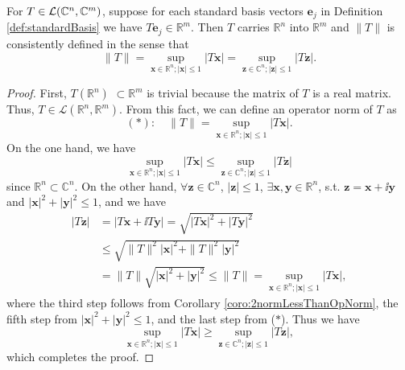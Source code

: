 \begin{lem}
  \label{lem:consistencyNestedRealInsideComplex}
  For $T\in{\cal L}(\mathbb{C}^n,\mathbb{C}^m)$, 
  suppose for each standard basis vectors $\mathbf{e}_j$
  in Definition \ref{def:standardBasis}
  we have $T \mathbf{e}_j \in \mathbb{R}^m$.
  Then $T$ carries $\mathbb{R}^n$ into $\mathbb{R}^m$
  and $\|T\|$ is consistently defined in the sense that
  \begin{equation}
    \label{eq:consistencyNestedRealInsideComplex}
    \|T\|
    = \sup_{\mathbf{x}\in \mathbb{R}^n; |\mathbf{x}|\le 1} |T \mathbf{x}|
    = \sup_{\mathbf{z}\in \mathbb{C}^n; |\mathbf{z}|\le 1} |T \mathbf{z}|.
  \end{equation}
\end{lem}
\begin{proof}
  First, $T(\mathbb{R}^n)$ $\subset \mathbb{R}^m$ is trivial
  because the matrix of $T$ is a real matrix.
  Thus, $T \in \mathcal{L}(\mathbb{R}^n, \mathbb{R}^m)$.
  From this fact, we can define an operator norm of $T$ as
  \begin{equation}\nonumber
    (*):\quad
    \|T\| = \underset{\mathbf{x}\in \mathbb{R}^n;
      |\mathbf{x}| \leq 1}{\sup}|T\mathbf{x}|.
  \end{equation}
  On the one hand, we have
  \begin{equation}\nonumber
    \underset{\mathbf{x}\in \mathbb{R}^n;
      |\mathbf{x}| \leq 1}{\sup}|T\mathbf{x}|
    \leq \underset{\mathbf{z}\in \mathbb{C}^n;
      |\mathbf{z}| \leq 1}{\sup}|T\mathbf{z}|
  \end{equation}
  since $\mathbb{R}^n \subset \mathbb{C}^n$. 
  On the other hand,
  $\forall \mathbf{z} \in \mathbb{C}^n$,
  $|\mathbf{z}| \leq 1$,
  $\exists \mathbf{x},\mathbf{y} \in \mathbb{R}^n$,
  s.t. $\mathbf{z} = \mathbf{x} + \ii \mathbf{y}$
  and $|\mathbf{x}|^2 + |\mathbf{y}|^2 \leq 1$, and we have
  \begin{align*}
    |T\mathbf{z}|
    &= |T\mathbf{x} + \ii T\mathbf{y}| =
       \sqrt{|T\mathbf{x}|^2 + |T\mathbf{y}|^2}
    \\
    &\le \sqrt{\|T\|^2|\mathbf{x}|^2 + \|T\|^2|\mathbf{y}|^2}
    \\
    &= \|T\|\sqrt{|\mathbf{x}|^2 + |\mathbf{y}|^2} \leq \|T\|
      = \underset{\mathbf{x}\in \mathbb{R}^n;
      |\mathbf{x}| \leq 1}{\sup}|T\mathbf{x}|,  
  \end{align*}
  \noindent where the third step follows from Corollary
  \ref{coro:2normLessThanOpNorm}, 
  the fifth step from $|\mathbf{x}|^2 + |\mathbf{y}|^2 \leq 1$, and
  the last step from ($*$). Thus we have
  \begin{displaymath}
    \underset{\mathbf{x}\in \mathbb{R}^n;
      |\mathbf{x}| \leq 1}{\sup}|T\mathbf{x}| \geq
    \underset{\mathbf{z}\in \mathbb{C}^n;
      |\mathbf{z}| \leq 1}{\sup}|T\mathbf{z}|,
  \end{displaymath}
  which completes the proof.
\end{proof}

